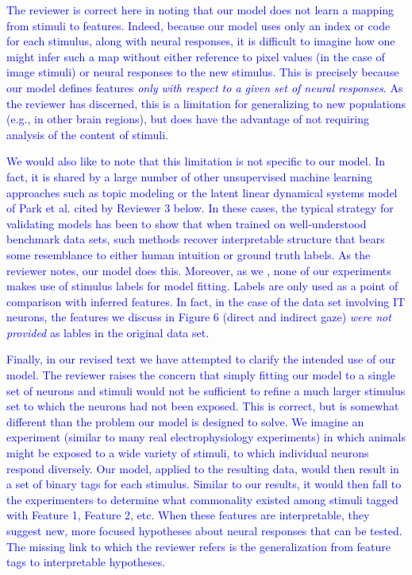 \documentclass[12pt,a4paper]{article}
\newcommand{\edit}[1]{\textcolor{blue}{#1}}
\begin{document}
{\color{red}{I want to be really careful here. This is just a first stab.}}

\edit{
The reviewer is correct here in noting that our model does not learn a mapping from stimuli to features. Indeed, because our model uses only an index or code for each stimulus, along with neural responses, it is difficult to imagine how one might infer such a map without either reference to pixel values (in the case of image stimuli) or neural responses to the new stimulus. This is precisely because our model defines features \emph{only with respect to a given set of neural responses}. As the reviewer has discerned, this is a limitation for generalizing to new populations (e.g., in other brain regions), but does have the advantage of not requiring analysis of the content of stimuli.
}

\edit{
We would also like to note that this limitation is not specific to our model. In fact, it is shared by a large number of other unsupervised machine learning approaches such as topic modeling or the latent linear dynamical systems model of Park et al. cited by Reviewer 3 below. In these cases, the typical strategy for validating models has been to show that when trained on well-understood benchmark data sets, such methods recover interpretable structure that bears some resemblance to either human intuition or ground truth labels. As the reviewer notes, our model does this. Moreover, as we {\color{red}{have clarified in the text}}, none of our experiments makes use of stimulus labels for model fitting. Labels are only used as a point of comparison with inferred features. In fact, in the case of the data set involving IT neurons, the features we discuss in Figure 6 (direct and indirect gaze) \emph{were not provided} as lables in the original data set.
}

\edit{
Finally, in our revised text {\color{red} we have attempted to clarify} the intended use of our model. The reviewer raises the concern that simply fitting our model to a single set of neurons and stimuli would not be sufficient to refine a much larger stimulus set to which the neurons had not been exposed. This is correct, but is somewhat different than the problem our model is designed to solve. We imagine an experiment (similar to many real electrophysiology experiments) in which animals might be exposed to a wide variety of stimuli, to which individual neurons respond diversely. Our model, applied to the resulting data, would then result in a set of binary tags for each stimulus. Similar to our results, it would then fall to the experimenters to determine what commonality existed among stimuli tagged with Feature 1, Feature 2, etc. When these features are interpretable, they suggest new, more focused hypotheses about neural responses that can be tested. The missing link to which the reviewer refers is the generalization from feature tags to interpretable hypotheses.
}
\end{document}
